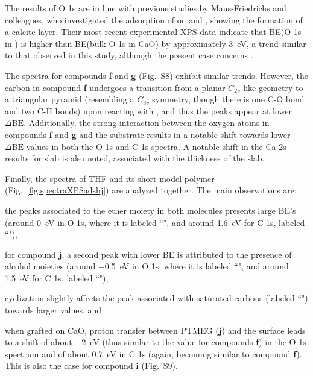 \documentclass[journal=jpccck,manuscript=article]{achemso}
\def\dbe{\ensuremath{\Delta\text{BE}}}
\begin{document}
The results of O 1s are in line with previous studies by Maus-Friedrichs and colleagues\cite{ochsCO2ChemisorptionCa1998,voigtsAdsorptionCO2CO2009,dahleSituPreparationCalcium2012}, who investigated the adsorption of  on  and , showing the formation of a calcite layer. Their most recent experimental XPS data\cite{dahleSituPreparationCalcium2012} indicate that BE(O 1s in ) is higher than BE(bulk O 1s in CaO) by approximately \SI{3}{\electronvolt}, a trend similar to that observed in this study, although the present case concerns . 

The spectra for compounds \textbf{f} and \textbf{g} (Fig.~S8) exhibit similar trends. However, the carbon in compound \textbf{f} undergoes a transition from a planar $C_{2v}$-like geometry to a triangular pyramid (resembling a $C_{3v}$ symmetry, though there is one C-O bond and two C-H bonds) upon reacting with , and thus the peaks appear at lower \dbe{}. Additionally, the strong interaction between the oxygen atoms in compounds \textbf{f} and \textbf{g} and the  substrate results in a notable shift towards lower \dbe{} values in both the O 1s and C 1s spectra.  A notable shift in the Ca 2s results for  slab is also noted, associated with the thickness of the slab.


Finally, the spectra of THF and its short model polymer (Fig.~\ref{fig:spectraXPSadshj}) are analyzed together. The main observations are: \begin{inparaenum}[(i)]
	\item the peaks associated to the ether moiety in both molecules presents large BE's (around \SI{0}{\electronvolt} in O 1s, where it is labeled ``", and around \SI{1.6}{\electronvolt} for C 1s, labeled ``"), 
	\item for compound \textbf{j}, a second peak with lower BE is attributed to the presence of alcohol moieties (around \SI{-0.5}{\electronvolt} in O 1s, where it is labeled ``", and around \SI{1.5}{\electronvolt} for C 1s, labeled ``"), 
	\item cyclization slightly affects the peak associated with saturated carbons (labeled ``") towards larger values, and
	\item when grafted on CaO, proton transfer between PTMEG (\textbf{j}) and the surface leads to a shift of about \SI{-2}{\electronvolt}  (thus similar to the value for compounds \textbf{f}) in the O 1s spectrum and of about \SI{0.7}{\electronvolt} in C 1s (again, becoming similar to compound \textbf{f}). This is also the case for compound \textbf{i} (Fig.~S9).
\end{inparaenum}
\end{document}
